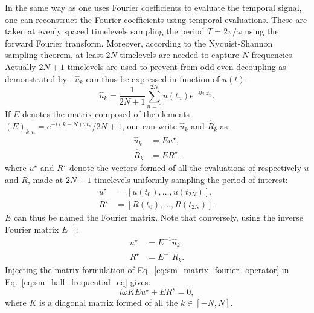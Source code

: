 In the same way as one uses Fourier coefficients to
evaluate the temporal signal,
one can reconstruct the Fourier coefficients using
temporal evaluations. These are taken at evenly spaced timelevels
sampling the period $T = 2 \pi / \omega$ using the forward
Fourier transform. Moreover, 
according to the Nyquist-Shannon~\cite{Shannon1949} sampling theorem, 
at least $2N$ timelevels are needed to capture $N$ frequencies. Actually
$2N+1$ timelevels are used to prevent from odd-even decoupling as
demonstrated by \citet{Weide2005}. $\widehat{u}_k$ can thus
be expressed in function of $u(t)$:
\begin{equation}
	\widehat{u}_k = \frac{1}{2N+1} 
	\sum_{n=0}^{2N} u(t_n) e^{-i k \omega t_n}.
\end{equation}
If $E$ denotes the matrix composed of the elements 
$(E)_{k,n} = e^{-i (k - N) \omega t_n} / 2N+1$, one can write $\widehat{u}_k$
and $\widehat{R}_k$ as:
\begin{equation}
	\begin{split}
		\widehat{u}_k &= E u^\star, \\
		\widehat{R}_k &= E R^\star.
	\end{split}
	\label{eq:sm_matrix_fourier_operator}
\end{equation}
where $u^\star$ and $R^\star$ 
denote the vectors formed of all the evaluations of respectively $u$
and $R$,
made at $2N+1$ timelevels uniformly sampling the period of interest:
\begin{equation}
	\begin{split}
		u^\star &= [u(t_0), \ldots, u(t_{2N})], \\
		R^\star &= [R(t_0), \ldots, R(t_{2N})].
	\end{split}
\end{equation}
$E$ can thus be named the Fourier matrix.
Note that conversely, using the inverse Fourier matrix $E^{-1}$:
\begin{equation}
	\begin{split}
		u^\star &= E^{-1} \widehat{u}_k \\
		R^\star &= E^{-1} \widehat{R}_k.
	\end{split}
	\label{eq:sm_sampling_hb_var}
\end{equation}
Injecting the matrix formulation of 
Eq.~\eqref{eq:sm_matrix_fourier_operator} in 
Eq.~\eqref{eq:sm_hall_frequential_eq}
gives:
\begin{equation}
	i \omega K E u^\star + E R^\star = 0,
\end{equation}
where $K$ is a diagonal matrix formed of all the $k \in [-N, N]$.
